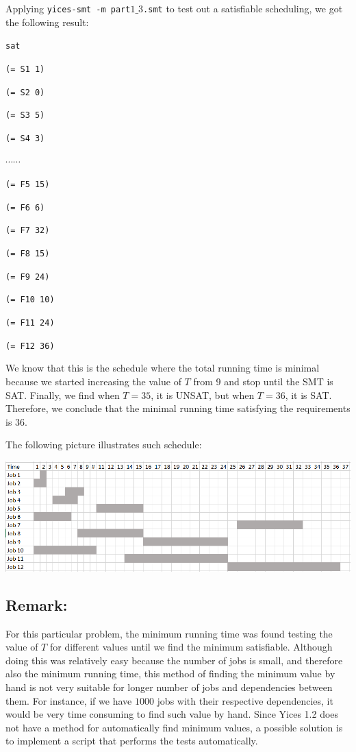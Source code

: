 \vspace{3mm}

Applying {\tt yices-smt -m part$1\_3$.smt} to test out a satisfiable scheduling, we got the following result:

{\footnotesize

{\tt sat}

{\tt (= S1 1)}

{\tt (= S2 0)}

{\tt (= S3 5)}

{\tt (= S4 3)}

$\cdots \cdots$

{\tt (= F5 15)}

{\tt (= F6 6)}

{\tt (= F7 32)}

{\tt (= F8 15)}

{\tt (= F9 24)}

{\tt (= F10 10)}

{\tt (= F11 24)}

{\tt (= F12 36)}
}

\vspace{3mm}

We know that this is the schedule where the total running time is minimal because we started increasing the value of $T$ from 9 and stop until the SMT is SAT. Finally, we find when $T = 35$, it is UNSAT, but when $T = 36$, it is SAT. Therefore, we conclude that the minimal running time satisfying the requirements is $36$.

The following picture illustrates such schedule:

\begin{center}
\includegraphics[width=1.0\textwidth]{Part1_3_1.png}
\end{center}

\subsection*{Remark:}

For this particular problem, the minimum running time was found testing the value of $T$ for different values until we find the minimum satisfiable. Although doing this was relatively easy because the number of jobs is small, and therefore also the minimum running time, this method of finding the minimum value by hand is not very suitable for longer number of jobs and dependencies between them. For instance, if we have $1000$ jobs with their respective dependencies, it would be very time consuming to find such value by hand. Since Yices 1.2 does not have a method for automatically find minimum values, a possible solution is to implement a script that performs the tests automatically.

